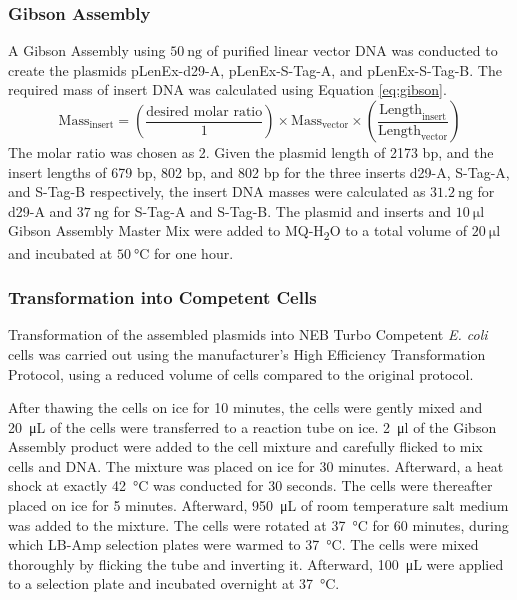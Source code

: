 \subsubsection{Gibson Assembly}
A Gibson Assembly using $\SI{50}{\nano\gram}$ of purified linear vector DNA was conducted to create the plasmids pLenEx-d29-A, pLenEx-S-Tag-A, and pLenEx-S-Tag-B. The required mass of insert DNA was calculated using Equation \ref{eq:gibson}.
\begin{equation}\label{eq:gibson}
\text{Mass}_{\text{insert}} = \left(\frac{\text{desired molar ratio}}{1}\right) \times \text{Mass}_{\text{vector}} \times \left(\frac{\text{Length}_{\text{insert}}}{\text{Length}_{\text{vector}}}\right)
\end{equation}
The molar ratio was chosen as 2. 
Given the plasmid length of 2173 bp, and the insert lengths of 679 bp, 802 bp, and 802 bp for the three inserts d29-A, S-Tag-A, and S-Tag-B respectively, the insert DNA masses were calculated as $\SI{31.2}{\nano\gram}$ for d29-A and $\SI{37}{\nano\gram}$ for S-Tag-A and S-Tag-B. 
The plasmid and inserts and $\SI{10}{\micro\litre}$ Gibson Assembly\textsuperscript{\textregistered} Master Mix were added to MQ-H\textsubscript{2}O to a total volume of $\SI{20}{\micro\litre}$ and incubated at $\SI{50}{\degreeCelsius}$ for one hour. 

\subsubsection{Transformation into Competent Cells}
Transformation of the assembled plasmids into NEB\textsuperscript{\textregistered} Turbo Competent \emph{E. coli} cells was carried out using the manufacturer's High Efficiency Transformation Protocol, using a reduced volume of cells compared to the original protocol.

After thawing the cells on ice for 10 minutes, the cells were gently mixed and \SI{20}{\micro\liter} of the cells were transferred to a reaction tube on ice. \SI{2}{\micro\litre} of the Gibson Assembly product were added to the cell mixture and carefully flicked to mix cells and DNA. The mixture was placed on ice for 30 minutes. Afterward, a heat shock at exactly \SI{42}{\celsius} was conducted for 30 seconds. The cells were thereafter placed on ice for 5 minutes. Afterward, \SI{950}{\micro\liter} of room temperature salt medium was added to the mixture. The cells were rotated at \SI{37}{\celsius} for 60 minutes, during which LB-Amp selection plates were warmed to \SI{37}{\celsius}. The cells were mixed thoroughly by flicking the tube and inverting it. Afterward, \SI{100}{\micro\liter} were applied to a selection plate and incubated overnight at \SI{37}{\celsius}.

